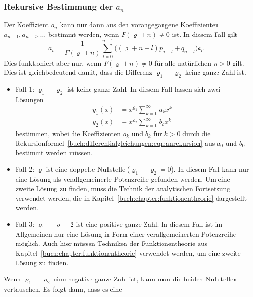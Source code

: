 \subsubsection{Rekursive Bestimmung der $a_n$}
Der Koeffizient $a_{n}$ kann nur dann aus den vorangegangene
Koeffizienten $a_{n-1},a_{n-2},\dots$ bestimmt werden, wenn
$F(\varrho+n)\ne 0$ ist.
In diesem Fall gilt
\begin{equation}
a_n
=
\frac{1}{F(\varrho+n)}
\sum_{l=0}^{n-1}\bigl( (\varrho+n-l)p_{n-l} + q_{n-l}\bigr)a_l.
\label{buch:differentialgleichungen:eqn:anrekursion}
\end{equation}
Dies funktioniert aber nur, wenn $F(\varrho+n)\ne 0$ für alle
natürlichen $n > 0$ gilt.
Dies ist gleichbedeutend damit, dass die Differenz $\varrho_1-\varrho_2$
keine ganze Zahl ist.

\begin{itemize}
\item
Fall 1: $\varrho_1-\varrho_2$ ist keine ganze Zahl.
In diesem Fall lassen sich zwei Lösungen
\begin{align*}
y_1(x) &= x^{\varrho_1}\sum_{k=0}^\infty a_k x^k
\\
y_2(x) &= x^{\varrho_2}\sum_{k=0}^\infty b_k x^k
\end{align*}
bestimmen, wobei die Koeffizienten $a_k$ und $b_k$ für $k>0$ durch
die Rekursionformel~\eqref{buch:differentialgleichungen:eqn:anrekursion}
aus $a_0$ und $b_0$ bestimmt werden müssen.

\item
Fall 2: $\varrho$ ist eine doppelte Nullstelle ($\varrho_1-\varrho_2=0$).
In diesem Fall kann nur eine Lösung als verallgemeinerte Potenzreihe
gefunden werden.
Um eine zweite Lösung zu finden, muss die Technik der analytischen
Fortsetzung verwendet werden, die in
Kapitel~\ref{buch:chapter:funktionentheorie}
dargestellt werden.

\item
Fall 3: $\varrho_1-\varrho-2$ ist eine positive ganze Zahl.
In diesem Fall ist im Allgemeinen nur eine Lösung in Form einer
verallgemeinerten Potenzreihe möglich.
Auch hier müssen Techniken der Funktionentheorie aus
Kapitel~\ref{buch:chapter:funktionentheorie}
verwendet werden, um eine zweite Lösung zu finden.

\end{itemize}

Wenn $\varrho_1-\varrho_2$ eine negative ganze Zahl ist, kann man die
beiden Nullstellen vertauschen.
Es folgt dann, dass es eine  





